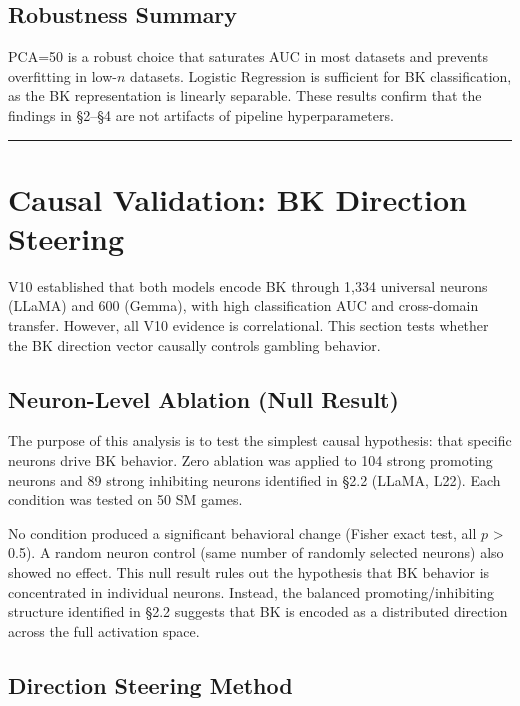 \documentclass[11pt,a4paper]{article}
\begin{document}
\subsection{Robustness Summary}

PCA=50 is a robust choice that saturates AUC in most datasets and prevents overfitting in low-$n$ datasets. Logistic Regression is sufficient for BK classification, as the BK representation is linearly separable. These results confirm that the findings in \S2--\S4 are not artifacts of pipeline hyperparameters.

\bigskip\hrule\bigskip

\section{Causal Validation: BK Direction Steering}\label{sec:steering}

V10 established that both models encode BK through 1{,}334 universal neurons (LLaMA) and 600 (Gemma), with high classification AUC and cross-domain transfer. However, all V10 evidence is correlational. This section tests whether the BK direction vector causally controls gambling behavior.

\subsection{Neuron-Level Ablation (Null Result)}

The purpose of this analysis is to test the simplest causal hypothesis: that specific neurons drive BK behavior. Zero ablation was applied to 104 strong promoting neurons and 89 strong inhibiting neurons identified in \S2.2 (LLaMA, L22). Each condition was tested on 50 SM games.

No condition produced a significant behavioral change (Fisher exact test, all $p$ > 0.5). A random neuron control (same number of randomly selected neurons) also showed no effect. This null result rules out the hypothesis that BK behavior is concentrated in individual neurons. Instead, the balanced promoting/inhibiting structure identified in \S2.2 suggests that BK is encoded as a distributed direction across the full activation space.

\subsection{Direction Steering Method}
\end{document}
